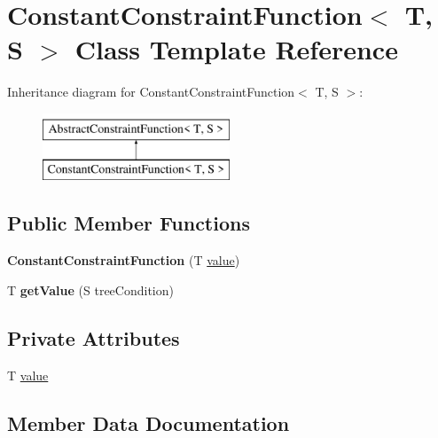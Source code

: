 \hypertarget{class_constant_constraint_function}{}\section{Constant\+Constraint\+Function$<$ T, S $>$ Class Template Reference}
\label{class_constant_constraint_function}
Inheritance diagram for Constant\+Constraint\+Function$<$ T, S $>$\+:\begin{figure}[H]
\begin{center}
\leavevmode
\includegraphics[height=2.000000cm]{d6/d3a/class_constant_constraint_function}
\end{center}
\end{figure}
\subsection*{Public Member Functions}
\begin{DoxyCompactItemize}
\item 
{\bfseries Constant\+Constraint\+Function} (T \hyperlink{class_constant_constraint_function_a9f5066596e6c190c36e7cd9cae09f235}{value})\hypertarget{class_constant_constraint_function_a11f6dcfea30a0d7658fcfb3b2e0d8799}{}\label{class_constant_constraint_function_a11f6dcfea30a0d7658fcfb3b2e0d8799}

\item 
T {\bfseries get\+Value} (S tree\+Condition)\hypertarget{class_constant_constraint_function_a5c6d270fb9c853586247b154d52469cc}{}\label{class_constant_constraint_function_a5c6d270fb9c853586247b154d52469cc}

\end{DoxyCompactItemize}
\subsection*{Private Attributes}
\begin{DoxyCompactItemize}
\item 
T \hyperlink{class_constant_constraint_function_a9f5066596e6c190c36e7cd9cae09f235}{value}
\end{DoxyCompactItemize}


\subsection{Member Data Documentation}
